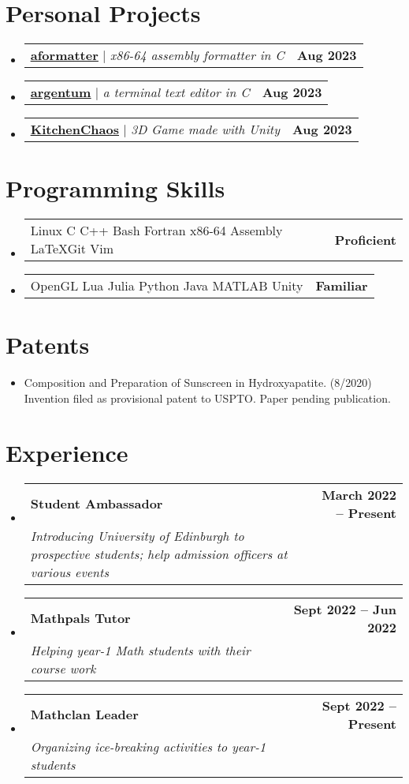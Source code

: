 \documentclass[letterpaper,11pt]{article}
\makeatletter
\newcommand{\resumeItem}[1]{
  \item\small{
    {#1 \vspace{-2pt}}
  }
}
\newcommand{\resumeSubheading}[4]{
  \vspace{-2pt}\item
    \begin{tabular*}{1.0\textwidth}[t]{l@{\extracolsep{\fill}}r}
      \textbf{#1} & \textbf{\small #2} \\
      \textit{\small#3} & \textit{\small #4} \\
    \end{tabular*}\vspace{-7pt}
}
\newcommand{\resumeProjectHeading}[2]{
    \item
    \begin{tabular*}{1.001\textwidth}{l@{\extracolsep{\fill}}r}
      \small#1 & \textbf{\small #2}\\
    \end{tabular*}\vspace{-7pt}
}
\newcommand{\resumeSubHeadingListStart}{\begin{itemize}[leftmargin=0.0in, label={}]}
\newcommand{\resumeSubHeadingListEnd}{\end{itemize}}
\newcommand{\resumeItemListStart}{\begin{itemize}}
\newcommand{\resumeItemListEnd}{\end{itemize}\vspace{-5pt}}
\makeatother
\begin{document}
\section{Personal Projects}
    \vspace{-5pt}
    \resumeSubHeadingListStart
    \resumeProjectHeading 
    {
    \href{https://github.com/harryhanYuhao/aformatter.git}{\underline{\textbf{aformatter}}} 
    $|$ \emph{x86-64 assembly formatter in C} 
    }{Aug 2023}

    \vspace{-30pt}
    \resumeProjectHeading 
    {
    \href{https://github.com/harryhanYuhao/argentum.git}{\underline{\textbf{argentum}}} 
    $|$ \emph{a terminal text editor in C} 
    }{Aug 2023}

    \vspace{-30pt}
    \resumeProjectHeading 
    {
    \href{https://github.com/harryhanYuhao/kitchenChaos.git}{\underline{\textbf{KitchenChaos}}} 
    $|$ \emph{3D Game made with Unity}
    }{Aug 2023}

   \resumeSubHeadingListEnd

\section{Programming Skills}
    \vspace{-5pt}
    \resumeSubHeadingListStart
    \resumeProjectHeading 
    { 
		Linux \textbullet{} C \textbullet{} C++ \textbullet{} Bash \textbullet{} Fortran \textbullet{} x86-64 Assembly \textbullet{} \LaTeX \textbullet Git \textbullet Vim
	}{Proficient}
    \resumeProjectHeading 
    { 
		OpenGL \textbullet Lua \textbullet{} Julia \textbullet Python \textbullet{} Java \textbullet{} MATLAB \textbullet{} Unity 
	}{Familiar}

   \resumeSubHeadingListEnd
%
\section{Patents}
\resumeItemListStart
\resumeItem{Composition and Preparation of Sunscreen in Hydroxyapatite. (8/2020) Invention filed as provisional patent to USPTO. Paper pending publication.}
\resumeItemListEnd

\section{Experience}
  \resumeSubHeadingListStart
    \resumeSubheading
      {Student Ambassador}{March 2022 -- Present}
      {Introducing University of Edinburgh to prospective students; help admission officers at various events}{}
    \resumeSubheading
      {Mathpals Tutor}{Sept 2022 -- Jun 2022}
      {Helping year-1 Math students with their course work}{}
    \resumeSubheading
      {Mathclan Leader}{Sept 2022 -- Present}
      {Organizing ice-breaking activities to year-1 students}{}
  \resumeSubHeadingListEnd
\end{document}
